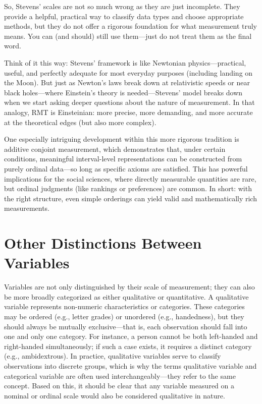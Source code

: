So, Stevens’ scales are not so much wrong as they are just incomplete. They provide a helpful, practical way to classify data types and choose appropriate methods, but they do not offer a rigorous foundation for what measurement truly means. You can (and should) still use them—just do not treat them as the final word.

Think of it this way: Stevens’ framework is like Newtonian physics—practical, useful, and perfectly adequate for most everyday purposes (including landing on the Moon). But just as Newton’s laws break down at relativistic speeds or near black holes—where Einstein’s theory is needed—Stevens’ model breaks down when we start asking deeper questions about the nature of measurement. In that analogy, RMT is Einsteinian: more precise, more demanding, and more accurate at the theoretical edges (but also more complex).

One especially intriguing development within this more rigorous tradition is additive conjoint measurement, which demonstrates that, under certain conditions, meaningful interval-level representations can be constructed from purely ordinal data—so long as specific axioms are satisfied. This has powerful implications for the social sciences, where directly measurable quantities are rare, but ordinal judgments (like rankings or preferences) are common. In short: with the right structure, even simple orderings can yield valid and mathematically rich measurements.

\section{Other Distinctions Between Variables}

Variables are not only distinguished by their scale of measurement; they can also be more broadly categorized as either qualitative or quantitative. A \gls{qualitative variable} represents non-numeric characteristics or categories. These categories may be ordered (e.g., letter grades) or unordered (e.g., handedness), but they should always be mutually exclusive—that is, each observation should fall into one and only one category. For instance, a person cannot be both left-handed and right-handed simultaneously; if such a case exists, it requires a distinct category (e.g., ambidextrous). In practice, qualitative variables serve to classify observations into discrete groups, which is why the terms qualitative variable and categorical variable are often used interchangeably—they refer to the same concept. Based on this, it should be clear that any variable measured on a nominal or ordinal scale would also be considered qualitative in nature.\label{sec:qual_var}

